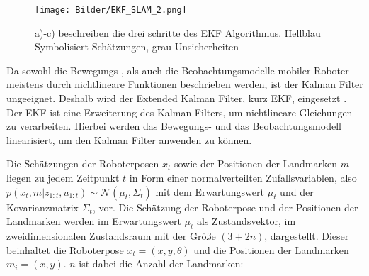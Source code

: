 
\begin{figure}
\centering
	\texttt{[image: Bilder/EKF\_SLAM\_2.png]}
	\caption{a)-c) beschreiben die drei schritte des EKF Algorithmus. Hellblau Symbolisiert Schätzungen, grau Unsicherheiten}
	\label{fig:KF}
\end{figure}

Da sowohl die Bewegungs-, als auch die Beobachtungsmodelle mobiler Roboter meistens durch nichtlineare Funktionen beschrieben werden, ist der Kalman Filter ungeeignet. Deshalb wird der Extended Kalman Filter, kurz EKF, eingesetzt \cite{Stachniss2016}. Der EKF ist eine Erweiterung des Kalman Filters, um nichtlineare Gleichungen zu verarbeiten. Hierbei werden das Bewegungs- und das Beobachtungsmodell linearisiert, um den Kalman Filter anwenden zu können.
 

Die Schätzungen der Roboterposen $ x_t $ sowie der Positionen der Landmarken $ m $ liegen zu jedem Zeitpunkt $ t $ in Form einer normalverteilten Zufallsvariablen, also \linebreak $ p(x_t,m \vert z_{1:t}, u_{1:t}) \sim \mathcal{N}(\mu_t,\Sigma_t) $ mit dem Erwartungswert $ \mu_t $ und der Kovarianzmatrix $ \Sigma_t $, vor. Die Schätzung der Roboterpose und der Positionen der Landmarken werden im Erwartungswert $\mu_t $ als Zustandsvektor, im zweidimensionalen Zustandsraum mit der Größe $(3+2n)$, dargestellt. Dieser beinhaltet die Roboterpose $x_t=(x,y,\theta)$ und die Positionen der Landmarken $m_i=(x,y)$. $n$ ist dabei die Anzahl der Landmarken: 

